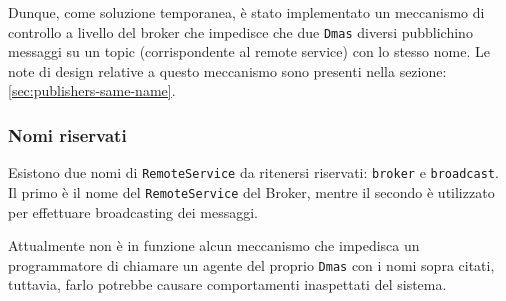 Dunque, come soluzione temporanea, è stato implementato un meccanismo di controllo a livello del broker che impedisce che due \texttt{Dmas} diversi pubblichino messaggi su un topic (corrispondente al remote service) con lo stesso nome.
Le note di design relative a questo meccanismo sono presenti nella sezione: \ref{sec:publishers-same-name}.

\subsubsection{Nomi riservati}
Esistono due nomi di \texttt{RemoteService} da ritenersi riservati: \texttt{broker} e \texttt{broadcast}. Il primo è il nome del \texttt{RemoteService} del Broker, mentre il secondo è utilizzato
per effettuare broadcasting dei messaggi.

Attualmente non è in funzione alcun meccanismo che impedisca un programmatore di chiamare un agente del proprio \texttt{Dmas} con i nomi sopra citati, tuttavia, farlo potrebbe causare comportamenti
inaspettati del sistema.